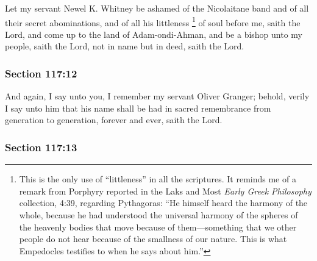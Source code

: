 		Let my servant Newel K. Whitney be ashamed of the Nicolaitane band and of all their secret abominations, and of all his littleness%
			\footnote{%
				This is the only use of ``littleness'' in all the scriptures. It reminds me of a remark from Porphyry reported in the Laks and Most \textit{Early Greek Philosophy} collection, 4:39, regarding Pythagoras: ``He himself heard the harmony of the whole, because he had understood the universal harmony of the spheres of the heavenly bodies that move because of them---something that we other people do not hear because of the smallness of our nature. This is what Empedocles testifies to when he says about him.''
				}
		of soul before me, saith the Lord, and come up to the land of Adam-ondi-Ahman, and be a bishop unto my people, saith the Lord, not in name but in deed, saith the Lord.


	\subsubsection{Section 117:12} %
		\label{DC117-12}

		And again, I say unto you, I remember my servant Oliver Granger; behold, verily I say unto him that his name shall be had in sacred remembrance from generation to generation, forever and ever, saith the Lord.


	\subsubsection{Section 117:13} %
		\label{DC117-13}

